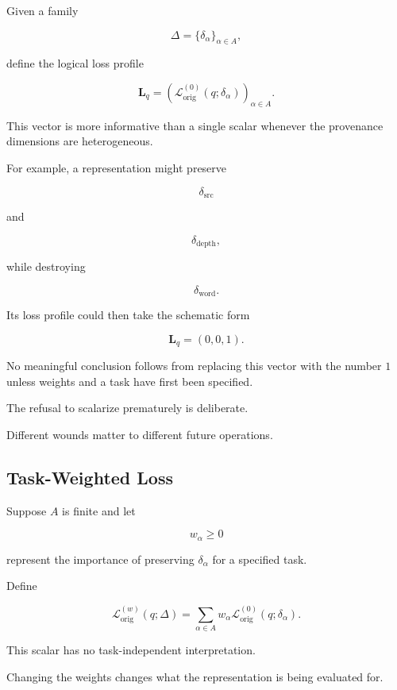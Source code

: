 \documentclass[
  11pt,
  a4paper,
  DIV=12,
  BCOR=0mm,
  parskip=half-
]{scrartcl}
\newcommand{\lossorig}{%
  \mathscr L_{\mathrm{orig}}%
}
\theoremstyle{definition}
\theoremstyle{plain}
\theoremstyle{remark}
\begin{document}
Given a family

\[
  \Delta
  =
  \{
    \delta_\alpha
  \}_{\alpha\in A},
\]

define the logical loss profile

\[
  \mathbf L_q
  =
  \left(
    \lossorig^{(0)}(q;\delta_\alpha)
  \right)_{\alpha\in A}.
\]

This vector is more informative than a single scalar whenever the provenance
dimensions are heterogeneous.

For example, a representation might preserve

\[
  \delta_{\mathrm{src}}
\]

and

\[
  \delta_{\mathrm{depth}},
\]

while destroying

\[
  \delta_{\mathrm{word}}.
\]

Its loss profile could then take the schematic form

\[
  \mathbf L_q=(0,0,1).
\]

No meaningful conclusion follows from replacing this vector with the number
\(1\) unless weights and a task have first been specified.

The refusal to scalarize prematurely is deliberate.

Different wounds matter to different future operations.


\subsection{Task-Weighted Loss}
\label{app:weighted-loss}

Suppose \(A\) is finite and let

\[
  w_\alpha\geq 0
\]

represent the importance of preserving \(\delta_\alpha\) for a specified
task.

Define

\[
  \lossorig^{(w)}(q;\Delta)
  =
  \sum_{\alpha\in A}
  w_\alpha
  \lossorig^{(0)}(q;\delta_\alpha).
\]

This scalar has no task-independent interpretation.

Changing the weights changes what the representation is being evaluated for.
\end{document}
